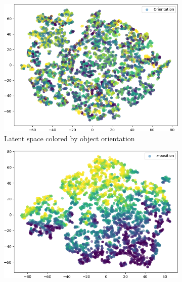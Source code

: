 \documentclass{beamer}
\begin{document}
\begin{frame}
\begin{figure}
\begin{adjustbox}{valign=T}
\begin{subfigure}{.19\textwidth}
\label{subfig:vae_embedding_dsprites_scale}
\end{subfigure}
\end{adjustbox}
\hfill
\begin{adjustbox}{valign=T}
\begin{subfigure}{.19\textwidth}
\includegraphics[width=\textwidth]{images/latent_spaces/dsprites/vae/embeddings_mu_2.png}
\caption{Latent space colored by object orientation}
\label{subfig:vae_embedding_dsprites_orientation}
\end{subfigure}
\end{adjustbox}
\hfill
\begin{adjustbox}{valign=T}
\begin{subfigure}{.19\textwidth}
\includegraphics[width=\textwidth]{images/latent_spaces/dsprites/vae/embeddings_mu_3.png}

\end{subfigure}
\end{adjustbox}
\end{figure}
\end{frame}
\end{document}
